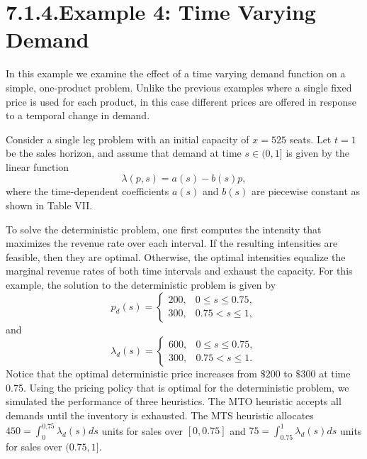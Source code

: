 \section{7.1.4.Example 4: Time Varying Demand}\label{time-varying-demand}

In this example we examine the effect of a time varying demand function on a simple, one-product problem. Unlike the previous examples where a single fixed price is used for each product, in this case different prices are offered in response to a temporal change in demand.

Consider a single leg problem with an initial capacity of \(x = 525\) seats. Let \(t = 1\) be the sales horizon, and assume that demand at time \(s \in (0, 1]\) is given by the linear function
\[
\lambda(p, s) = a(s) - b(s) p ,
\]
where the time-dependent coefficients \(a(s)\) and \(b(s)\) are piecewise constant as shown in Table VII.

To solve the deterministic problem, one first computes the intensity that maximizes the revenue rate over each interval. If the resulting intensities are feasible, then they are optimal. Otherwise, the optimal intensities equalize the marginal revenue rates of both time intervals and exhaust the capacity. For this example, the solution to the deterministic problem is given by
\[
p_d(s) = \left\{ \begin{array}{cc} 
200, & 0 \leqslant s \leqslant 0.75, \\
300, & 0.75 < s \leqslant 1, 
\end{array} \right.
\]
and
\[
\lambda_d(s) = \left\{ \begin{array}{ll} 
600, & 0 \leqslant s \leqslant 0.75, \\
300, & 0.75 < s \leqslant 1. 
\end{array} \right.
\]
Notice that the optimal deterministic price increases from \(\$200\) to \(\$300\) at time 0.75. Using the pricing policy that is optimal for the deterministic problem, we simulated the performance of three heuristics. The MTO heuristic accepts all demands until the inventory is exhausted. The MTS heuristic allocates \(450 = \int_{0}^{0.75} \lambda_d(s) ds\) units for sales over \([0, 0.75]\) and \(75 = \int_{0.75}^{1} \lambda_d(s) ds\) units for sales over \((0.75, 1]\).


